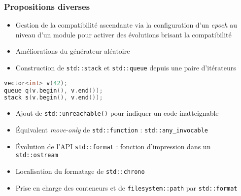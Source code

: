 \documentclass[C++.tex]{subfiles}
\begin{document}
\begin{frame}[fragile]
	\frametitle{Propositions diverses}
	\begin{itemize}
		\item Gestion de la compatibilité ascendante via la configuration d'un \textit{epoch} au niveau d'un module pour activer des évolutions brisant la compatibilité


		\item Améliorations du générateur aléatoire
		\item Construction de \lstinline|std::stack| et \lstinline|std::queue| depuis une paire d'itérateurs
	\end{itemize}

	\begin{lstlisting}[language=C++]
vector<int> v(42);
queue q(v.begin(), v.end());
stack s(v.begin(), v.end());\end{lstlisting}


	\begin{itemize}
		\item Ajout de \lstinline|std::unreachable()| pour indiquer un code inatteignable


		\item Équivalent \textit{move-only} de \lstinline|std::function| : \lstinline|std::any_invocable|
		\item Évolution de l'API \lstinline|std::format| : fonction d'impression dans un \lstinline|std::ostream|
		\item Localisation du formatage de \lstinline|std::chrono|
		\item Prise en charge des conteneurs et de \lstinline|filesystem::path| par \lstinline|std::format|
	\end{itemize}
\end{frame}
\end{document}
